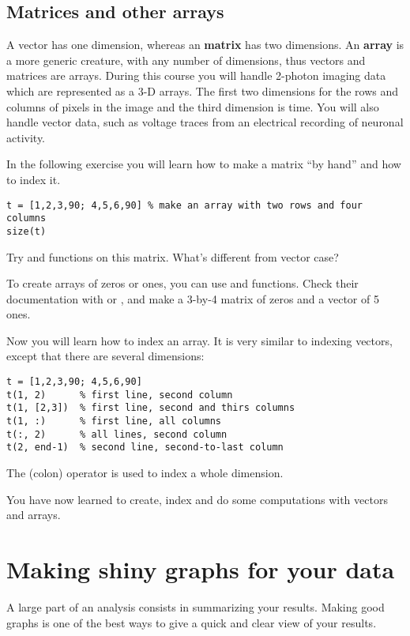 \documentclass{article}
\begin{document}
\subsection*{Matrices and other arrays}

A vector has one dimension, whereas an \textbf{matrix} has two dimensions.
An \textbf{array} is a more generic creature, with any number of dimensions, thus vectors and matrices are arrays.
During this course you will handle 2-photon imaging data which are represented as a 3-D arrays.
The first two dimensions for the rows and columns of pixels in the image and the third dimension is time.
You will also handle vector data, such as voltage traces from an electrical recording of neuronal activity.

In the following exercise you will learn how to make a matrix ``by hand'' and how to index it.
\begin{lstlisting}
t = [1,2,3,90; 4,5,6,90] % make an array with two rows and four columns
size(t)
\end{lstlisting}
Try  and  functions on this matrix.
What's different from vector case?

To create arrays of zeros or ones, you can use  and  functions.
Check their documentation with  or , and make a 3-by-4 matrix of zeros and a vector of 5 ones.

Now you will learn how to index an array.
It is very similar to indexing vectors, except that there are several dimensions:
\begin{lstlisting}
t = [1,2,3,90; 4,5,6,90]
t(1, 2)      % first line, second column
t(1, [2,3])  % first line, second and thirs columns
t(1, :)      % first line, all columns
t(:, 2)      % all lines, second column
t(2, end-1)  % second line, second-to-last column
\end{lstlisting}
The \mcode{:} (colon) operator is used to index a whole dimension.

You have now learned to create, index and do some computations with vectors and arrays.

\section{Making shiny graphs for your data}

A large part of an analysis consists in summarizing your results.
Making good graphs is one of the best ways to give a quick and clear view of your results.
\end{document}
